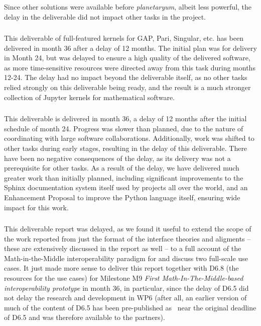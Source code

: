 Since other solutions were available before \emph{planetaryum}, albeit
less powerful, the delay in the deliverable did not impact other tasks
in the project.


\subsubsection{\protect{}}

This deliverable of full-featured kernels for GAP, Pari, Singular, etc.  has been
delivered in month 36 after a delay of 12 months.  The initial plan was for delivery in
Month 24, but was delayed to ensure a high quality of the delivered software, as more
time-sensitive resources were directed away from this task during months 12-24.  The delay
had no impact beyond the deliverable itself, as no other tasks relied strongly on this
deliverable being ready, and the result is a much stronger collection of Jupyter kernels
for mathematical software.

\subsubsection{\protect{}}

This deliverable is delivered in month 36, a delay of 12 months after the initial schedule
of month 24.  Progress was slower than planned, due to the nature of coordinating with
large software collaborations.  Additionally, work was shifted to other tasks during early
stages, resulting in the delay of this deliverable.  There have been no negative
consequences of the delay, as its delivery was not a prerequisite for other tasks.  As a
result of the delay, we have delivered much greater work than initially planned, including
significant improvements to the Sphinx documentation system itself used by projects all
over the world, and an Enhancement Proposal to improve the Python language itself,
ensuring wide impact for this work.


\subsubsection{\protect{}}
This deliverable report was delayed, as we found it useful to extend the scope of the work
reported from just the format of the interface theories and aligments -- these are
extensively discussed in the report as well -- to a full account of the Math-in-the-Middle
interoperability paradigm for \pn and discuss two full-scale use cases. It just made more
sense to deliver this report together with D6.8 (the resources for the use cases) for
Milestone M9 \emph{First Math-In-The-Middle-based interoperability prototype} in month 36,
in particular, since the delay of D6.5 did not delay the research and development in WP6
(after all, an earlier version of much of the content of D6.5 has been pre-published
as~\cite{WieKohRab:vtuimkb17,KohMuePfe:kbimss17} near the original deadline of D6.5 and
was therefore available to the \pn partners). 

